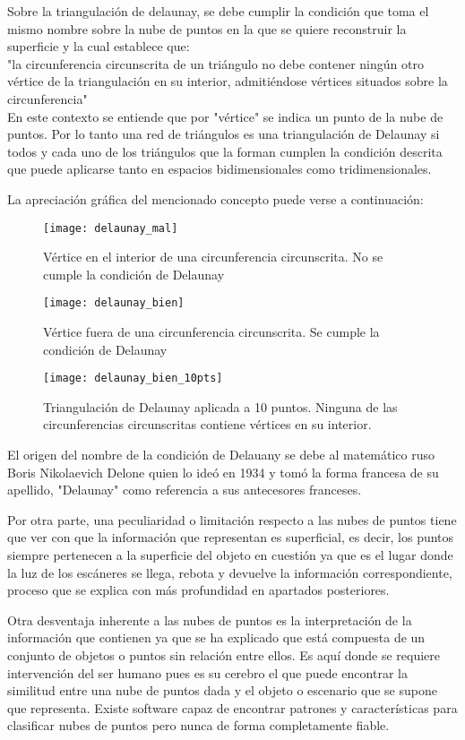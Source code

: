 Sobre la triangulación de delaunay, se debe cumplir la condición que toma el mismo nombre sobre la nube de puntos en la que se quiere reconstruir la superficie y la cual establece que:
\\
"la circunferencia circunscrita de un triángulo no debe contener ningún otro vértice de la triangulación en su interior, admitiéndose vértices situados sobre la circunferencia"
\\
En este contexto se entiende que por "vértice" se indica un punto de la nube de puntos.
Por lo tanto una red de triángulos es una triangulación de Delaunay si todos y cada uno de los triángulos que la forman cumplen la condición descrita que puede aplicarse tanto en espacios bidimensionales como tridimensionales.

La apreciación gráfica del mencionado concepto puede verse a continuación:
\begin{figure}[!htb]
  \texttt{[image: delaunay\_mal]}
  \caption{Vértice en el interior de una circunferencia circunscrita. No se cumple la condición de Delaunay}\label{fig:del_mal}
\endminipage\hfill
{}
  \texttt{[image: delaunay\_bien]}
  \caption{Vértice fuera de una circunferencia circunscrita. Se cumple la condición de Delaunay}\label{fig:del_bien}
\endminipage\hfill
{}
  \texttt{[image: delaunay\_bien\_10pts]}
	\caption{Triangulación de Delaunay aplicada a 10 puntos. Ninguna de las circunferencias circunscritas contiene vértices en su interior.}\label{fig:del_bien_10pts}
\endminipage
\end{figure}
El origen del nombre de la condición de Delauany se debe al matemático ruso Boris Nikolaevich Delone quien lo ideó en 1934 y tomó la forma francesa de su apellido, "Delaunay" como referencia a sus antecesores franceses.


Por otra parte, una peculiaridad o limitación respecto a las nubes de puntos tiene que ver con que la
información que representan es superficial, es decir, los puntos siempre pertenecen a la superficie del
objeto en cuestión ya que es el lugar donde la luz de los escáneres se llega, rebota y devuelve la
información correspondiente, proceso que se explica con más profundidad en apartados posteriores.

Otra desventaja inherente a las nubes de puntos es la interpretación de la información que contienen ya
que se ha explicado que está compuesta de un conjunto de objetos o puntos sin relación entre ellos. Es
aquí donde se requiere intervención del ser humano pues es su cerebro el que puede encontrar la similitud
entre una nube de puntos dada y el objeto o escenario que se supone que representa. Existe software capaz
de encontrar patrones y características para clasificar nubes de puntos pero nunca de forma
completamente fiable.

